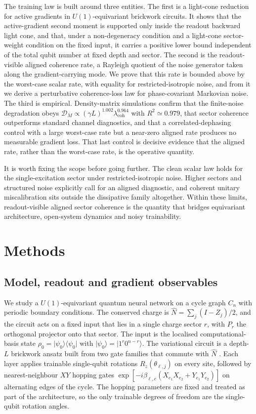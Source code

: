 \documentclass{article}
\newcommand{\DM}{\mathcal{D}_M}
\newcommand{\lcoh}{\lambda_{\mathrm{coh}}}
\providecommand{\ket}[1]{\lvert #1\rangle}
\providecommand{\bra}[1]{\langle #1\rvert}
\begin{document}
The training law is built around three entities. The first is a light-cone reduction for active gradients in $U(1)$-equivariant brickwork circuits. It shows that the active-gradient second moment is supported only inside the readout backward light cone, and that, under a non-degeneracy condition and a light-cone sector-weight condition on the fixed input, it carries a positive lower bound independent of the total qubit number at fixed depth and sector. The second is the readout-visible aligned coherence rate, a Rayleigh quotient of the noise generator taken along the gradient-carrying mode. We prove that this rate is bounded above by the worst-case scalar rate, with equality for restricted-isotropic noise, and from it we derive a perturbative coherence-loss law for phase-covariant Markovian noise. The third is empirical. Density-matrix simulations confirm that the finite-noise degradation obeys $\DM\propto(\gamma L)^{1.002}\lcoh^{0.964}$ with $R^2\simeq0.979$, that sector coherence outperforms standard channel diagnostics, and that a correlated-dephasing control with a large worst-case rate but a near-zero aligned rate produces no measurable gradient loss. That last control is decisive evidence that the aligned rate, rather than the worst-case rate, is the operative quantity.

It is worth fixing the scope before going further. The clean scalar law holds for the single-excitation sector under restricted-isotropic noise. Higher sectors and structured noise explicitly call for an aligned diagnostic, and coherent unitary miscalibration sits outside the dissipative family altogether. Within these limits, readout-visible aligned sector coherence is the quantity that bridges equivariant architecture, open-system dynamics and noisy trainability.

\section{Methods}\label{sec:methods}

\subsection{Model, readout and gradient observables}\label{sec:model}

We study a $U(1)$-equivariant quantum neural network on a cycle graph $C_n$ with periodic boundary conditions. The conserved charge is $\hat N=\sum_j(I-Z_j)/2$, and the circuit acts on a fixed input that lies in a single charge sector $r$, with $P_r$ the orthogonal projector onto that sector. The input is the localised computational-basis state $\rho_0=\ket{\psi_0}\bra{\psi_0}$ with $\ket{\psi_0}=\ket{1^r 0^{n-r}}$. The variational circuit is a depth-$L$ brickwork ansatz built from two gate families that commute with $\hat N$ \cite{nguyen2024,schatzki2024,larocca2022groupinv}. Each layer applies trainable single-qubit rotations $R_z(\theta_{\ell,j})$ on every site, followed by nearest-neighbour $XY$ hopping gates $\exp[-i\beta_{\ell,e}(X_{e_1}X_{e_2}+Y_{e_1}Y_{e_2})]$ on alternating edges of the cycle. The hopping parameters are fixed and treated as part of the architecture, so the only trainable degrees of freedom are the single-qubit rotation angles.
\end{document}
